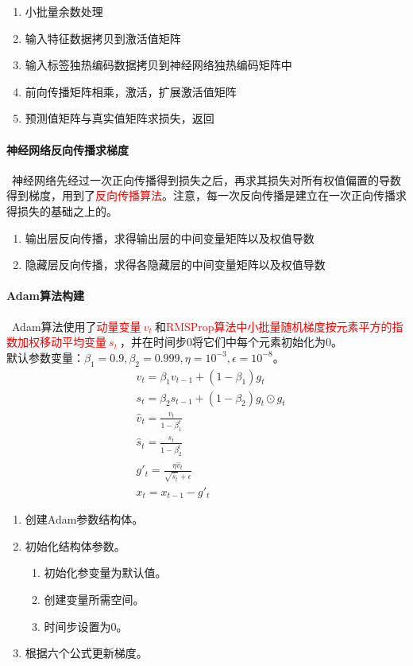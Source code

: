 \begin{enumerate}
  \item 小批量余数处理
  \item 输入特征数据拷贝到激活值矩阵
  \item 输入标签独热编码数据拷贝到神经网络独热编码矩阵中
  \item 前向传播矩阵相乘，激活，扩展激活值矩阵
  \item 预测值矩阵与真实值矩阵求损失，返回
\end{enumerate}

\paragraph{神经网络反向传播求梯度} ~神经网络先经过一次正向传播得到损失之后，再求其损失对所有权值偏置的导数得到梯度，用到了\textcolor{red}{反向传播算法}。注意，每一次反向传播是建立在一次正向传播求得损失的基础之上的。

\begin{enumerate}
  \item 输出层反向传播，求得输出层的中间变量矩阵以及权值导数
  \item 隐藏层反向传播，求得各隐藏层的中间变量矩阵以及权值导数
\end{enumerate}

\paragraph{Adam算法构建}~Adam算法使用了\textcolor{red}{动量变量$~v_t~$}和\textcolor{red}{RMSProp算法中小批量随机梯度按元素平方的指数加权移动平均变量$~s_t~$}，并在时间步0将它们中每个元素初始化为0。\\
默认参数变量：$\beta_1=0.9, \beta_2=0.999, \eta=10^{-3}, \epsilon=10^{-8}$。
\begin{align}
  & v_t=\beta_1v_{t-1}+(1-\beta_1)g_t\\
  & s_t = \beta_2s_{t-1}+(1-\beta_2)g_t\odot g_t \\
  & \hat{v}_t=\frac{v_t}{1-\beta^t_1}\\
  & \hat{s}_t=\frac{s_t}{1-\beta^t_2}\\
  & g'_t=\frac{\eta \hat{v}_t}{\sqrt{\hat{s}_t}+\epsilon}\\
  & x_t = x_{t-1}- g'_t
\end{align}
\begin{enumerate}
  \item 创建Adam参数结构体。
  \item 初始化结构体参数。
  \begin{enumerate}
    \item 初始化参变量为默认值。
    \item 创建变量所需空间。
    \item 时间步设置为0。
  \end{enumerate}
  \item 根据六个公式更新梯度。
\end{enumerate}

